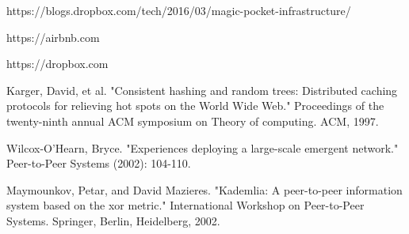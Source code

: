 \documentclass[conference]{IEEEtran}
\begin{document}
\begin{thebibliography}{1}
 https://blogs.dropbox.com/tech/2016/03/magic-pocket-infrastructure/

 https://airbnb.com

 https://dropbox.com

 Karger, David, et al. "Consistent hashing and random trees: Distributed caching protocols for relieving hot spots on the World Wide Web." Proceedings of the twenty-ninth annual ACM symposium on Theory of computing. ACM, 1997.

 Wilcox-O’Hearn, Bryce. "Experiences deploying a large-scale emergent network." Peer-to-Peer Systems (2002): 104-110.

 Maymounkov, Petar, and David Mazieres. "Kademlia: A peer-to-peer information system based on the xor metric." International Workshop on Peer-to-Peer Systems. Springer, Berlin, Heidelberg, 2002.

\end{thebibliography}

% 







\end{document}
